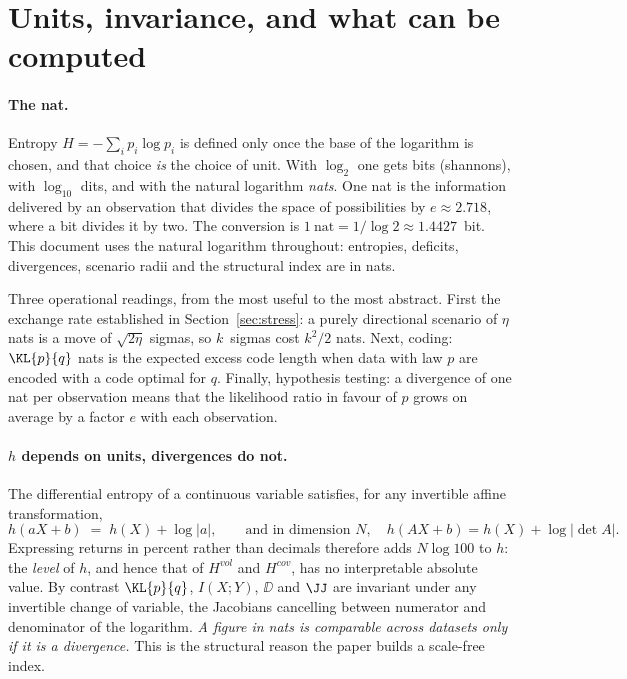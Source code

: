 
\appendix

\section{Units, invariance, and what can be computed}
\label{app:units}

\paragraph{The nat.} Entropy $H=-\sum_i p_i\log p_i$ is defined only once the
base of the logarithm is chosen, and that choice \emph{is} the choice of unit.
With $\log_2$ one gets bits (shannons), with $\log_{10}$ dits, and with the
natural logarithm \emph{nats}. One nat is the information delivered by an
observation that divides the space of possibilities by $e\approx2.718$, where a
bit divides it by two. The conversion is $1~\text{nat}=1/\log 2\approx1.4427$~bit.
This document uses the natural logarithm throughout: entropies, deficits,
divergences, scenario radii and the structural index are in nats.

Three operational readings, from the most useful to the most abstract. First the
exchange rate established in Section~\ref{sec:stress}: a purely directional
scenario of $\eta$ nats is a move of $\sqrt{2\eta}$ sigmas, so $k$~sigmas cost
$k^2/2$ nats. Next, coding: $\KL{p}{q}$ nats is the expected excess code length
when data with law $p$ are encoded with a code optimal for $q$. Finally,
hypothesis testing: a divergence of one nat per observation means that the
likelihood ratio in favour of $p$ grows on average by a factor $e$ with each
observation.

\paragraph{$h$ depends on units, divergences do not.} The differential entropy
of a continuous variable satisfies, for any invertible affine transformation,
\begin{equation}
\label{eq:h-scaling}
h(aX+b) \;=\; h(X) + \log|a| ,
\qquad\text{and in dimension } N,\quad h(AX+b)=h(X)+\log|\det A| .
\end{equation}
Expressing returns in percent rather than decimals therefore adds $N\log 100$ to
$h$: the \emph{level} of $h$, and hence that of $H^{vol}$ and $H^{cov}$, has no
interpretable absolute value. By contrast $\KL{p}{q}$, $I(X;Y)$, $\DD$ and $\JJ$
are invariant under any invertible change of variable, the Jacobians cancelling
between numerator and denominator of the logarithm. \emph{A figure in nats is
comparable across datasets only if it is a divergence.} This is the structural
reason the paper builds a scale-free index.

